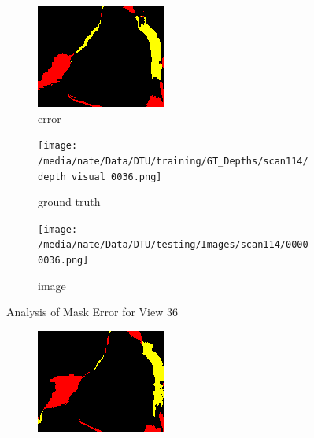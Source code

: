 \documentclass{article}
\begin{document}
\begin{figure}
\begin{subfigure}{0.3\textwidth}
		\includegraphics[width=\textwidth]{./output/036_error.png}
		\caption{error}
		\label{fig:error36}
	\end{subfigure}
	\hfill
	\centering
	\begin{subfigure}{0.3\textwidth}
		\centering
		\texttt{[image: /media/nate/Data/DTU/training/GT\_Depths/scan114/depth\_visual\_0036.png]}
		\caption{ground truth}
		\label{fig:gt36}
	\end{subfigure}
	\hfill
	\centering
	\begin{subfigure}{0.3\textwidth}
		\centering
		\texttt{[image: /media/nate/Data/DTU/testing/Images/scan114/00000036.png]}
		\caption{image}
		\label{fig:img36}
	\end{subfigure}
	\hfill
	\caption{Analysis of Mask Error for View 36}
	\label{fig:error_analys36}
\end{figure}\begin{figure}
	\centering
	\begin{subfigure}{0.3\textwidth}
		\centering
		\includegraphics[width=\textwidth]{./output/037_error.png}

\end{subfigure}
\end{figure}
\end{document}
